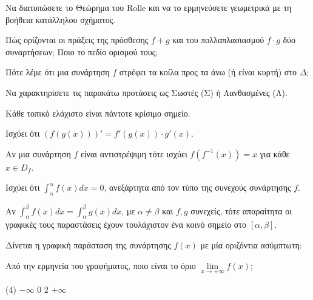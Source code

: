 \documentclass[11pt,a4paper]{article}
\newcommand{\kerkissans}[1]{{\fontfamily{maksf}\selectfont \textbf{#1}}}
\renewcommand{\textdexiakeraia}{}
\newcommand{\dint}{\displaystyle\int}
\newcommand\themanum{A}
\newcounter{thema}[section]
\renewcommand{\thethema}{\arabic{thema}}
\newcommand{\Thema}{\refstepcounter{thema}{\textbf{\textcolor{black}{\faPenSquare\ \  \large \kerkissans{\textbf{\thethemaο\hspace{2mm}Διαγώνισμα - Θέμα \themanum}}}}}\hspace{0mm}}{}
\newenvironment{thema}[1]
{\begin{tcolorbox}[title=\Thema\kerkissans{\textbf{\large{  #1}}},breakable,
enhanced standard,titlerule=0pt,toprule=0pt, rightrule=0pt, bottomrule=0pt,
colback=white,left=0mm,top=1mm,bottom=0mm,
boxrule=0pt,
colframe=white,leftrule=0mm,sharp corners,coltitle=black]
\renewcommand{\themanum}{#1}}
{\end{tcolorbox}}
\begin{document}
\begin{thema}{A}
\begin{erwthma}
    \item Να διατυπώσετε το Θεώρημα του Rolle και να το ερμηνεύσετε γεωμετρικά με τη βοήθεια κατάλληλου σχήματος.
    \item Πώς ορίζονται οι πράξεις της πρόσθεσης $f+g$ και του πολλαπλασιασμού $f \cdot g$ δύο συναρτήσεων; Ποιο το πεδίο ορισμού τους;
    \item Πότε λέμε ότι μια συνάρτηση $f$ στρέφει τα κοίλα προς τα άνω (ή είναι κυρτή) στο $\Delta$;
    \item Να χαρακτηρίσετε τις παρακάτω προτάσεις ως Σωστές (Σ) ή Λανθασμένες (Λ).
    \begin{alist}
        \item Κάθε τοπικό ελάχιστο είναι πάντοτε κρίσιμο σημείο.
        \item Ισχύει ότι $(f(g(x)))' = f'(g(x)) \cdot g'(x)$.
        \item Αν μια συνάρτηση $f$ είναι αντιστρέψιμη τότε ισχύει $f(f^{-1}(x))=x$ για κάθε $x\in D_f$.
        \item Ισχύει ότι $\dint_{\alpha}^{\alpha} f(x) dx = 0$, ανεξάρτητα από τον τύπο της συνεχούς συνάρτησης $f$.
        \item Αν $\dint_\alpha^\beta f(x) dx = \dint_\alpha^\beta g(x) dx$, με $\alpha \ne \beta$ και $f,g$ συνεχείς, τότε απαραίτητα οι γραφικές τους παραστάσεις έχουν τουλάχιστον ένα κοινό σημείο στο $[\alpha, \beta]$.
    \end{alist}
    \item Δίνεται η γραφική παράσταση της συνάρτησης $f(x)$ με μία οριζόντια ασύμπτωτη:
    \begin{center}
    \end{center}
    Από την ερμηνεία του γραφήματος, ποιο είναι το όριο $\lim\limits_{x\to +\infty} f(x)$;
    \begin{tasks}[label=\let\textdexiakeraia\relax\alph*.](4)
        \task $-\infty$
        \task $0$
        \task $2$
        \task $+\infty$
    \end{tasks}
\end{erwthma}
\end{thema}
\vspace{1cm}
\end{document}
